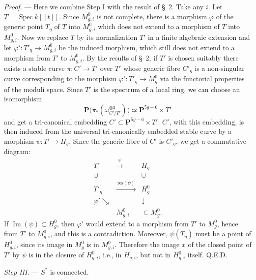 \documentclass[10pt]{article}
\newcommand{\Spec}{\operatorname{Spec}}
\newcommand{\PP}{\mathbf P}
\begin{document}
\noindent\emph{Proof.} --- Here we combine Step I with the result of \S~2. Take any $i$. Let $T=\Spec k[[t]]$. Since $M^0_{g,i}$ is not complete, there is a morphism $\varphi$ of the generic point $T_\eta$ of $T$ into $M^0_{g,i}$ which does not extend to a morphism of $T$ into $M^0_{g,i}$. Now we replace $T$ by its normalization $T'$ in a finite algebraic extension and let $\varphi':T'_\eta\to M^0_{g,i}$ be the induced morphism, which still does not extend to a morphism from $T'$ to $M^0_{g,i}$. By the results of \S~2, if $T'$ is chosen suitably there exists a stable curve $\pi:C'\to T'$ over $T'$ whose generic fibre $C'_\eta$ is a non-singular curve corresponding to the morphism $\varphi':T'_\eta\to M_g^0$ via the functorial properties of the moduli space. Since $T'$ is the spectrum of a local ring, we can choose an isomorphism
\[
\PP\bigl(\pi_*(\omega_{C'/T'}^{\otimes3})\bigr)\simeq\PP^{5g-6}\times T'
\]
and get a tri-canonical embedding $C'\subset\PP^{5g-6}\times T'$. $C'$, with this embedding, is then induced from the universal tri-canonically embedded stable curve by a morphism $\psi:T'\to H_g$. Since the generic fibre of $C'$ is $C'_\eta$, we get a commutative diagram:
\[
\begin{array}{ccc}
T'&\xrightarrow{\ \psi\ }&H_g\\
\cup&&\cup\\
T'_\eta&\xrightarrow{\ \mathrm{res}(\psi)\ }&H_g^0\\
\varphi'\searrow&&\downarrow\\
& M^0_{g,i}&\subset M_g^0.
\end{array}
\]
If $\operatorname{Im}(\psi)\subset H_g^0$, then $\varphi'$ would extend to a morphism from $T'$ to $M_g^0$, hence from $T'$ to $M^0_{g,i}$, and this is a contradiction. Moreover, $\psi(T_\eta)$ must be a point of $H^0_{g,i}$, since its image in $M_g^0$ is in $M^0_{g,i}$. Therefore the image $x$ of the closed point of $T'$ by $\psi$ is in the closure of $H^0_{g,i}$, i.e., in $H_{g,i}$, but not in $H^0_{g,i}$ itself. Q.E.D.

\medskip
\noindent\emph{Step III.} --- $S^*$ is connected.
\end{document}
